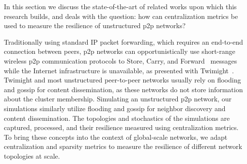 In this section we discuss the state-of-the-art of related works upon which this research builds, and deals with the question: how can centralization metrics be used to measure the resilience of unstructured p2p networks?

Traditionally using standard IP packet forwarding, which requires an end-to-end connection between peers, p2p networks can opportunistically use short-range wireless p2p communication protocols to Store, Carry, and Forward~\cite{dtn} messages while the Internet infrastructure is unavailable, as presented with Twimight~\cite{twimight}.
Twimight and most unstructured peer-to-peer networks usually rely on flooding and gossip for content dissemination, as these networks do not store information about the cluster membership. 
Simulating an unstructured p2p network, our simulations similarly utilize flooding and gossip for neighbor discovery and content dissemination.
The topologies and stochastics of the simulations are captured, processed, and their resilience measured using centralization metrics.
To bring these concepts into the context of global-scale networks, we adapt centralization and sparsity metrics to measure the resilience of different network topologies at scale.
